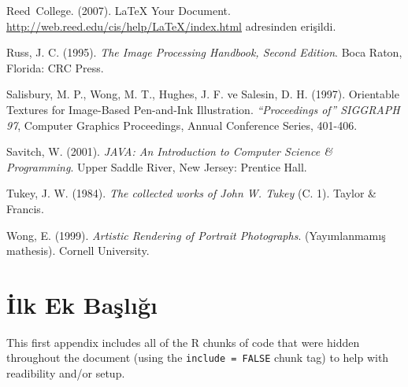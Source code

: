 \documentclass[12pt,twoside]{deuthesis}
\begin{document}
\begin{CSLReferences}{1}{0}
\leavevmode{}%
Reed~College. (2007). LaTeX Your Document. \url{http://web.reed.edu/cis/help/LaTeX/index.html} adresinden erişildi.

\leavevmode{}%
Russ, J. C. (1995). \emph{{The Image Processing Handbook, Second Edition}}. Boca Raton, Florida: CRC Press.

\leavevmode{}%
Salisbury, M. P., Wong, M. T., Hughes, J. F. ve Salesin, D. H. (1997). Orientable Textures for Image-Based Pen-and-Ink Illustration. \emph{{``Proceedings of''} SIGGRAPH 97}, Computer Graphics Proceedings, Annual Conference Series, 401-406.

\leavevmode{}%
Savitch, W. (2001). \emph{JAVA: An Introduction to Computer Science \& Programming}. Upper Saddle River, New Jersey: Prentice Hall.

\leavevmode{}%
Tukey, J. W. (1984). \emph{The collected works of John W. Tukey} (C. 1). Taylor \& Francis.

\leavevmode{}%
Wong, E. (1999). \emph{{Artistic Rendering of Portrait Photographs}}. (Yayımlanmamış mathesis). Cornell University.

\end{CSLReferences}
\setlength{\parindent}{-0.20in}
\setlength{\leftskip}{0.20in}
\setlength{\parskip}{8pt}

\appendix

\hypertarget{ilk-ek-baux15flux131ux11fux131}{%
\chapter{İlk Ek Başlığı}\label{ilk-ek-baux15flux131ux11fux131}}

This first appendix includes all of the R chunks of code that were hidden throughout the document (using the \texttt{include\ =\ FALSE} chunk tag) to help with readibility and/or setup.
\end{document}
